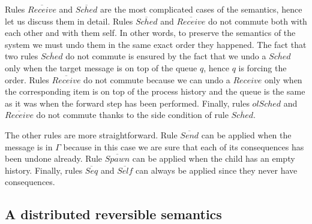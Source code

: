 \documentclass[runningheads]{llncs}
\newcommand{\ol}[1]{\overline{#1}}
\begin{document}
Rules $\ol{Receive}$ and $\ol{Sched}$ are the most complicated cases of the semantics,
hence let us discuss them in detail. Rules $\ol{Sched}$ and $\ol{Receive}$ do
not commute both with each other and with them self.
In other words, to preserve the semantics of the system we must undo them in
the same exact order they happened. The fact that two rules
$\ol{Sched}$ do not commute is ensured by the fact that we undo a $\ol{Sched}$ only
when the target message is on top of the queue $q$, hence $q$ is forcing the order. Rules $\ol{Receive}$ do not
commute because we can undo a $Receive$ only when the corresponding item is on
top of the process history and the queue is the same as it was when the forward
step has been performed. Finally, rules $ol{Sched}$ and $\ol{Receive}$ do not commute
thanks to the side condition of rule $\ol{Sched}$.

The other rules are more straightforward. Rule $\ol{Send}$ can be applied when
the message is in $\Gamma$ because in this case we are sure that each of its
consequences has been undone already. Rule $\ol{Spawn}$ can be applied when the child
has an empty history. Finally, rules $\ol{Seq}$ and $\ol{Self}$ can always be applied since they never have
consequences.

\subsection{A distributed reversible semantics}\label{app:dist-rev-sem}
\end{document}
